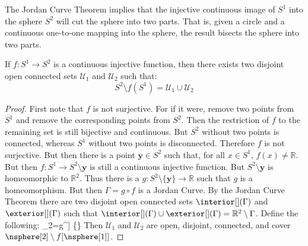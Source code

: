 \documentclass{article}                                                        %
\begin{document}
        The Jordan Curve Theorem implies that the injective continuous
        image of $S^{1}$ into the sphere $S^{2}$ will cut the
        sphere into two parts. That is, given a circle and
        a continuous one-to-one mapping into the sphere, the
        result bisects the sphere into two parts.
        \begin{theorem}
            \label{thm:Sphere_Without_Circle_Is_Disconnected}
            If $f:S^{1}\rightarrow{S}^{2}$ is a continuous injective
            function, then there exists two disjoint open connected
            sets $\mathcal{U}_{1}$ and $\mathcal{U}_{2}$ such that:
            \begin{equation}
                S^{2}\setminus{f}(S^{1})
                =\mathcal{U}_{1}\cup\mathcal{U}_{2}
            \end{equation}
        \end{theorem}
        \begin{proof}
            First note that $f$ is not surjective. For if it were,
            remove two points from $S^{1}$ and remove the corresponding
            points from $S^{2}$. Then the restriction of $f$ to the
            remaining set is still bijective and continuous. But
            $S^{2}$ without two points is connected, whereas $S^{1}$
            without two points is disconnected. Therefore $f$ is not
            surjective. But then there is a point $\mathbf{y}\in{S}^{2}$
            such that, for all $x\in{S}^{1}$, $f(x)\ne\mathbb{R}$.
            But then $f:S^{1}\rightarrow{S}^{2}\setminus\mathbf{y}$
            is still a continuous injective function. But
            $S^{2}\setminus\mathbf{y}$ is homeomorphic to $\mathbb{R}^{2}$.
            Thus there is a
            $g:S^{2}\setminus\{\mathbf{y}\}\rightarrow\mathbb{R}$
            such that $g$ is a homeomorphism. But then $\Gamma=g\circ{f}$
            is a Jordan Curve. By the Jordan Curve Theorem there are two
            disjoint open connected sets $\interior[](\Gamma)$ and
            $\exterior[](\Gamma)$ such that
            $\interior[](\Gamma)\cup\exterior[](\Gamma)=\mathbb{R}^{2}\setminus\Gamma$.
            Define the following:
            {%
                _{2}=g^{}\big[\exterior[]{\Gamma}\big]
                                \cup\{\}
            }
            Then $\mathcal{U}_{1}$ and $\mathcal{U}_{2}$ are open, disjoint,
            connected, and cover $\nsphere[2]\setminus{f}[\nsphere[1]]$.
        \end{proof}
\end{document}
